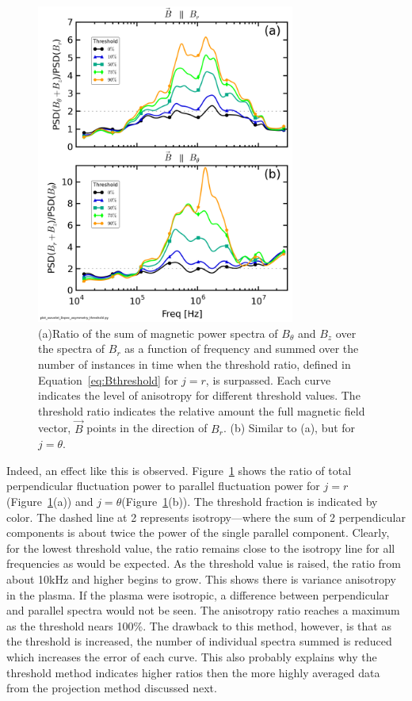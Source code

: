 \documentclass[aip,prl,amsmath,amssymb,reprint,superscriptaddress]{revtex4-1} %
\begin{document}
\begin{figure}[!htbp]
\centerline{
\includegraphics[width=8.5cm]{Bperppara_spectra_thresholdscan40t60us}}
\caption{\label{fig:thresholdmethod} (a)Ratio of the sum of magnetic power spectra of $B_{\theta}$ and $B_{z}$ over the spectra of $B_{r}$ as a function of frequency and summed over the number of instances in time when the threshold ratio, defined in Equation~\ref{eq:Bthreshold} for $j=r$, is surpassed. Each curve indicates the level of anisotropy for different threshold values. The threshold ratio indicates the relative amount the full magnetic field vector, $\vec{B}$ points in the direction of $B_{r}$. (b) Similar to (a), but for $j=\theta$.}
\end{figure}

Indeed, an effect like this is observed. Figure~\ref{fig:thresholdmethod} shows the ratio of total perpendicular fluctuation power to parallel fluctuation power for $j = r$(Figure~\ref{fig:thresholdmethod}(a)) and $j = \theta$(Figure~\ref{fig:thresholdmethod}(b)). The threshold fraction is indicated by color. The dashed line at 2 represents isotropy---where the sum of 2 perpendicular components is about twice the power of the single parallel component. Clearly, for the lowest threshold value, the ratio remains close to the isotropy line for all frequencies as would be expected. As the threshold value is raised, the ratio from about 10kHz and higher begins to grow. This shows there is variance anisotropy in the plasma. If the plasma were isotropic, a difference between perpendicular and parallel spectra would not be seen. The anisotropy ratio reaches a maximum as the threshold nears 100\%. The drawback to this method, however, is that as the threshold is increased, the number of individual spectra summed is reduced which increases the error of each curve. This also probably explains why the threshold method indicates higher ratios then the more highly averaged data from the projection method discussed next.
\end{document}
